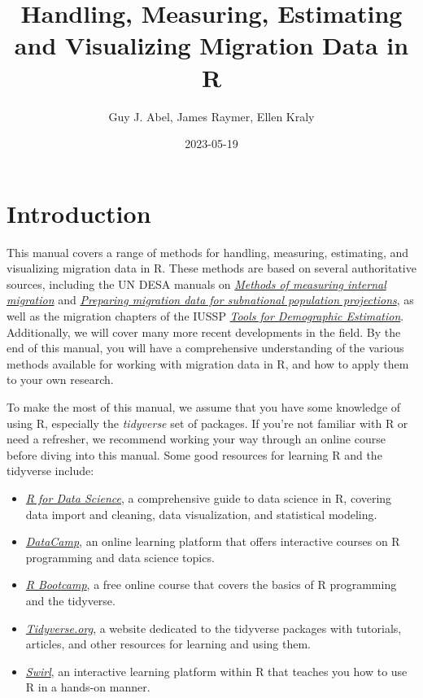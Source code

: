 \documentclass[
]{book}
\title{Handling, Measuring, Estimating and Visualizing Migration Data in R}
\author{Guy J. Abel, James Raymer, Ellen Kraly}
\date{2023-05-19}
\providecommand{\tightlist}{%
  \setlength{\itemsep}{0pt}\setlength{\parskip}{0pt}}
\begin{document}
\maketitle

{
\setcounter{tocdepth}{1}
\tableofcontents
}
\hypertarget{introduction}{%
\chapter{Introduction}\label{introduction}}

This manual covers a range of methods for handling, measuring, estimating, and visualizing migration data in R. These methods are based on several authoritative sources, including the UN DESA manuals on \href{https://www.un.org/en/development/desa/population/publications/manual/migration/measuring-migration.asp}{\emph{Methods of measuring internal migration}} and \href{https://www.un.org/en/development/desa/population/publications/manual/migration/subnational-migration.asp}{\emph{Preparing migration data for subnational population projections}}, as well as the migration chapters of the IUSSP \href{http://demographicestimation.iussp.org/content/migration}{\emph{Tools for Demographic Estimation}}. Additionally, we will cover many more recent developments in the field. By the end of this manual, you will have a comprehensive understanding of the various methods available for working with migration data in R, and how to apply them to your own research.

To make the most of this manual, we assume that you have some knowledge of using R, especially the \emph{tidyverse} set of packages. If you're not familiar with R or need a refresher, we recommend working your way through an online course before diving into this manual. Some good resources for learning R and the tidyverse include:

\begin{itemize}
\tightlist
\item
  \href{https://r4ds.had.co.nz/}{\emph{R for Data Science}}, a comprehensive guide to data science in R, covering data import and cleaning, data visualization, and statistical modeling.
\item
  \href{https://www.datacamp.com/}{\emph{DataCamp}}, an online learning platform that offers interactive courses on R programming and data science topics.
\item
  \href{https://r-bootcamp.netlify.app/}{\emph{R Bootcamp}}, a free online course that covers the basics of R programming and the tidyverse.
\item
  \href{https://www.tidyverse.org/learn/}{\emph{Tidyverse.org}}, a website dedicated to the tidyverse packages with tutorials, articles, and other resources for learning and using them.
\item
  \href{https://swirlstats.com/}{\emph{Swirl}}, an interactive learning platform within R that teaches you how to use R in a hands-on manner.
\end{itemize}
\end{document}
